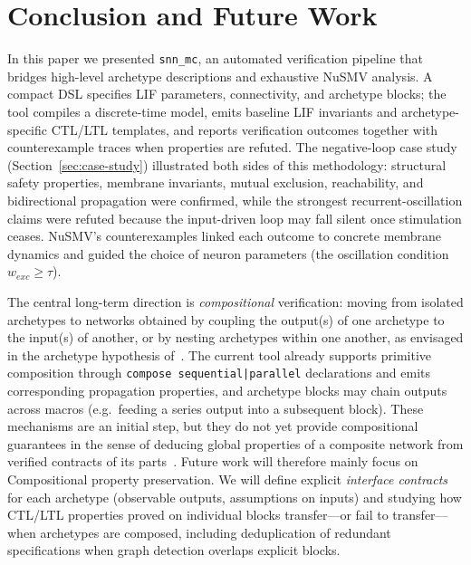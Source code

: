\documentclass[
]{ceurart}
\begin{document}
\section{Conclusion and Future Work}
\label{sec:conclusion}

In this paper we presented \texttt{snn\_mc}, an automated verification pipeline that
bridges high-level archetype descriptions and exhaustive NuSMV analysis. A compact DSL
specifies LIF parameters, connectivity, and archetype blocks; the tool compiles a
discrete-time model, emits baseline LIF invariants and archetype-specific CTL/LTL
templates, and reports verification outcomes together with counterexample traces when
properties are refuted. The negative-loop case study (Section~\ref{sec:case-study})
illustrated both sides of this methodology: structural safety properties, membrane
invariants, mutual exclusion, reachability, and bidirectional propagation were confirmed,
while the strongest recurrent-oscillation claims were refuted because the input-driven loop
may fall silent once stimulation ceases. NuSMV's counterexamples linked each outcome to
concrete membrane dynamics and guided the choice of neuron parameters (the oscillation
condition $w_{exc} \ge \tau$).

The central long-term direction is \emph{compositional} verification: moving from
isolated archetypes to networks obtained by coupling the output(s) of one archetype
to the input(s) of another, or by nesting archetypes within one another, as envisaged
in the archetype hypothesis of~\cite{DeMaria2020,DeMaria2017}. The current tool
already supports primitive composition through \texttt{compose sequential|parallel}
declarations and emits corresponding propagation properties, and archetype blocks may
chain outputs across macros (e.g.\ feeding a series output into a subsequent block).
These mechanisms are an initial step, but they do not yet provide compositional
guarantees in the sense of deducing global properties of a composite network from
verified contracts of its parts~\cite{Clarke1999b}. Future work will therefore mainly focus on Compositional property preservation. We will define explicit \emph{interface contracts} for each archetype (observable outputs, assumptions on inputs) and studying how CTL/LTL properties proved on individual blocks transfer---or fail to transfer---when archetypes are composed, including deduplication of redundant specifications when graph detection overlaps explicit blocks.
\end{document}
